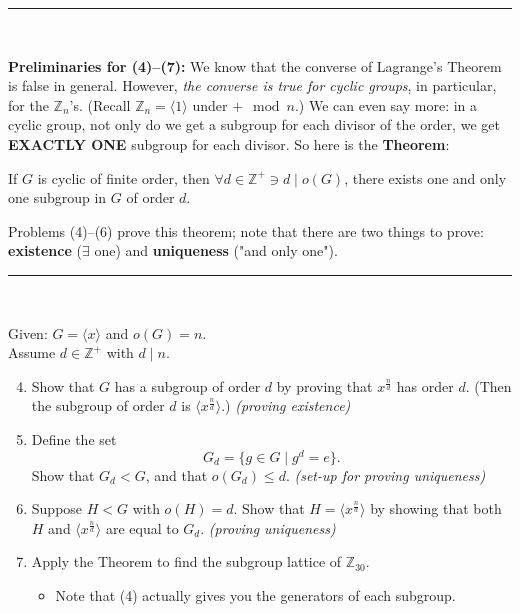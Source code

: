 \noindent \rule{\textwidth}{0.4pt} \\ \steezybreak

\noindent \textbf{Preliminaries for (4)--(7):}  
We know that the converse of Lagrange's Theorem is false in general. However, \textit{the converse is true for cyclic groups}, in particular, for the $ \mathbb{Z}_n $'s.  
(Recall $ \mathbb{Z}_n = \langle 1 \rangle $ under $ + \mod n $.)  
We can even say more: in a cyclic group, not only do we get a subgroup for each divisor of the order, we get \textbf{EXACTLY ONE} subgroup for each divisor. So here is the \textbf{Theorem}:  
\begin{theorem*}
    If $G$ is cyclic  of finite order, then $\forall d \in \mathbb{Z}^+ \ni  d \mid o(G)$, there exists one and only one subgroup in $G$ of order $d$.
\end{theorem*}
\noindent Problems (4)--(6) prove this theorem; note that there are two things to prove: \textbf{existence} ($\exists$ one) and \textbf{uniqueness} ("and only one"). \\ \steezybreak

\noindent \rule{\textwidth}{0.4pt} \\ \steezybreak

\noindent Given: $ G = \langle x \rangle $ and $ o(G) = n $.  \\
\noindent Assume $ d \in \mathbb{Z}^+ $ with $ d \mid n $. \\

\begin{enumerate}
    \setcounter{enumi}{3} %
    \item Show that $ G $ has a subgroup of order $ d $ by proving that $ x^{\frac{n}{d}} $ has order $ d $.  
    (Then the subgroup of order $ d $ is $ \langle x^{\frac{n}{d}} \rangle $.)  
    \mbox{}\hfill \textit{(proving existence)} \\ \steezybreak
    
    \item Define the set 
    \[
    G_d = \{ g \in G \mid g^d = e \}.
    \]
    Show that $ G_d < G $, and that $ o(G_d) \leq d $.  
    \mbox{}\hfill \textit{(set-up for proving uniqueness)} \\ \steezybreak
    
    \item Suppose $ H < G $ with $ o(H) = d $.  
    Show that $ H = \langle x^{\frac{n}{d}} \rangle $  
    by showing that both $ H $ and $ \langle x^{\frac{n}{d}} \rangle $ are equal to $ G_d $.  
    \mbox{}\hfill \textit{(proving uniqueness)} \\ \steezybreak
    
    \item Apply the Theorem to find the subgroup lattice of $ \mathbb{Z}_{30} $.  
    \begin{itemize}
        \item Note that (4) actually gives you the generators of each subgroup.
    \end{itemize}
\end{enumerate}
\newpage 

